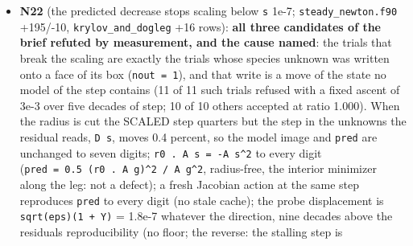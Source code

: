 \documentclass[english,a4paper]{my_memo}
\begin{document}
\begin{itemize}
  \texttt{restart\_round\_trip.sh}\textquotesingle s Python readers fixed. Deviations from the
  design, stated: no \texttt{EXHALE\_STATIONARY\_EVALUATE\_ONLY} env hook (the second
  word is the one answer); the \texttt{provenance\ unknown} mark is not yet in
  \texttt{EXHALE\_setup.out} (\texttt{write\_setup\_report.f90} not owned; one line);
  \texttt{species\_columns} reported not refused (the by-label species map is a
  documented path); \texttt{source} is the git revision, not an executable md5.
  \textbf{Consequence for the user (decision item 21)}: the exact \texttt{options}
  comparison forbids the arm-ladder workflow (converge without an option,
  restart with it on); legacy pairs are unaffected, every new rung would be
  refused; the disciplined fix is a key naming the tokens allowed to differ.
  Also corrected: \texttt{docs/input\_schema.md} appendix D listed the retired
  \texttt{valve}/\texttt{fluxconst} fields and the wrong \texttt{base\_bc} values. Reported:
  \texttt{Run\ mode} is absent from \texttt{input\_schema.md}; the \texttt{EXHALE\_PTC=1} route
  writes no setup report; a re-evaluated state writes \texttt{sec\_ion\_step=0}.
\item
  \textbf{N22} (the predicted decrease stops scaling below \texttt{\textbar{}\textbar{}s\textbar{}\textbar{}} 1e-7;
  \texttt{steady\_newton.f90} +195/-10, \texttt{krylov\_and\_dogleg} +16 rows): \textbf{all three
  candidates of the brief refuted by measurement, and the cause named}:
  the trials that break the scaling are exactly the trials whose species
  unknown was written onto a face of its box (\texttt{nout\ =\ 1}), and that write is
  a move of the state no model of the step contains (11 of 11 such trials
  refused with a fixed ascent of 3e-3 over five decades of step; 10 of 10
  others accepted at ratio 1.000). When the radius is cut the SCALED step
  quarters but the step in the unknowns the residual reads, \texttt{\textbar{}\textbar{}D\ s\textbar{}\textbar{}},
  moves 0.4 percent, so the model image and \texttt{pred} are unchanged to seven
  digits; \texttt{r0\ .\ A\ s\ =\ -\textbar{}\textbar{}A\ s\textbar{}\textbar{}\^{}2} to every digit (\texttt{pred\ =\ 0.5\ (r0\ .\ A\ g)\^{}2\ /\ \textbar{}\textbar{}A\ g\textbar{}\textbar{}\^{}2}, radius-free, the interior minimizer along the leg: not a
  defect); a fresh Jacobian action at the same step reproduces \texttt{pred} to
  every digit (no stale cache); the probe displacement is \texttt{sqrt(eps)(1\ +\ \textbar{}\textbar{}Y\textbar{}\textbar{})} = 1.8e-7 whatever the direction, nine decades above the
  residual\textquotesingle s reproducibility (no floor; the reverse: the stalling step is

\end{itemize}
\end{document}
